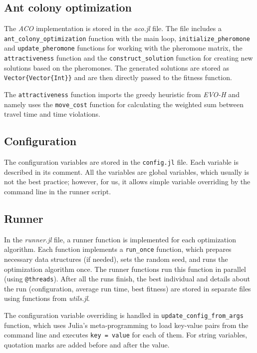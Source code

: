 \subsection{Ant colony optimization}

The \textit{ACO} implementation is stored in the \textit{aco.jl} file. The file includes a \texttt{ant\_colony\_optimization} function with the main loop, \texttt{initialize\_pheromone} and \texttt{update\_pheromone} functions for working with the pheromone matrix, the \texttt{attractiveness} function and the \texttt{construct\_solution} function for creating new solutions based on the pheromones. The generated solutions are stored as \texttt{Vector\{Vector\{Int\}\}} and are then directly passed to the fitness function.

The \texttt{attractiveness} function imports the greedy heuristic from \textit{EVO-H} and namely uses the \texttt{move\_cost} function for calculating the weighted sum between travel time and time violations.

\subsection{Configuration}

The configuration variables are stored in the \texttt{config.jl} file. Each variable is described in its comment. All the variables are global variables, which usually is not the best practice; however, for us, it allows simple variable overriding by the command line in the runner script.

\subsection{Runner}

In the \textit{runner.jl} file, a runner function is implemented for each optimization algorithm. Each function implements a \texttt{run\_once} function, which prepares necessary data structures (if needed), sets the random seed, and runs the optimization algorithm once. The runner functions run this function in parallel (using \texttt{@threads}). After all the runs finish, the best individual and details about the run (configuration, average run time, best fitness) are stored in separate files using functions from \textit{utils.jl}.

The configuration variable overriding is handled in \texttt{update\_config\_from\_args} function, which uses Julia's meta-programming to load key-value pairs from the command line and executes \texttt{key = value} for each of them. For string variables, quotation marks are added before and after the value.

